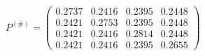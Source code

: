 \documentclass{standalone}
\begin{document}
		$P^{(\#)} =
		\begin{pmatrix}
			0.2737 & 0.2416 & 0.2395 & 0.2448 \\
			0.2421 & 0.2753 & 0.2395 & 0.2448 \\
			0.2421 & 0.2416 & 0.2814 & 0.2448 \\
			0.2421 & 0.2416 & 0.2395 & 0.2655
		\end{pmatrix}$
\end{document}
